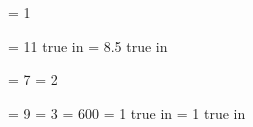 

\pdfoutput           = 1

\pdfpageheight       = 11 true in
\pdfpagewidth        = 8.5 true in

\pdfminorversion     = 7
\pdfobjcompresslevel = 2

\pdfcompresslevel    = 9
\pdfdecimaldigits    = 3
\pdfpkresolution     = 600
\pdfhorigin          = 1 true in
\pdfvorigin          = 1 true in
